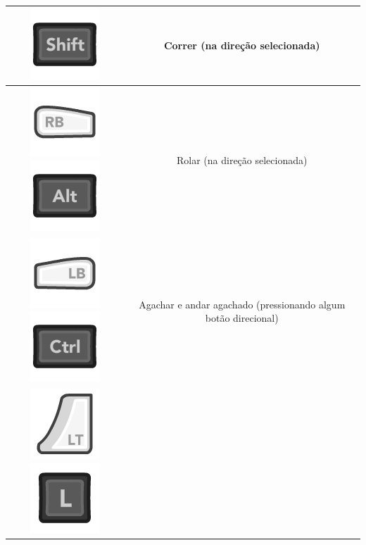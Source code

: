 \documentclass[12pt]{article}
\begin{document}
\begin{longtable}{|c|c|}
\includegraphics[scale=0.3]{images/kShift.png}
 & Correr (na direção selecionada)
\\
\hline
\includegraphics[scale=0.3]{images/360_RB.png}
\includegraphics[scale=0.3]{images/kAlt.png}
& Rolar (na direção selecionada) 
\\
\hline
\includegraphics[scale=0.3]{images/360_LB.png}
\includegraphics[scale=0.3]{images/kCtrl.png}
& Agachar e andar agachado (pressionando algum botão direcional)
\\
\hline
\includegraphics[scale=0.3]{images/360_LT.png}
\includegraphics[scale=0.3]{images/kL.png}

\end{longtable}
\end{document}
